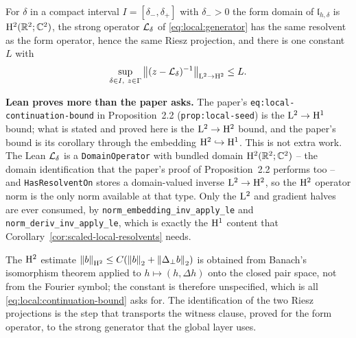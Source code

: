 \begin{lemma}
  \label{lem:local:h2-resolvent}
  \leanok
  For $\delta$ in a compact interval $I=[\delta_-,\delta_+]$ with $\delta_->0$ the form
  domain of $\mathfrak l_{h,\delta}$ is $\mathrm{H}^2(\mathbb{R}^2;\mathbb{C}^2)$, the strong operator
  $\mathcal{L}_\delta$ of \eqref{eq:local:generator} has the same resolvent as the form operator,
  hence the same Riesz projection, and there is one constant $L$ with
  \begin{equation}
    \sup_{\delta\in I,\ z\in\Gamma}
      \left\|(z-\mathcal{L}_\delta)^{-1}\right\|_{\mathrm{L}^2\to\mathrm{H}^2}\leq L .
    \label{eq:local:continuation-bound}
  \end{equation}
\end{lemma}

\textbf{Lean proves more than the paper asks.}  The paper's
\texttt{eq:local-continuation-bound} in Proposition~2.2 (\texttt{prop:local-seed}) is the
$\mathrm{L}^2\to\mathrm{H}^1$ bound; what is stated and proved here is the $\mathrm{L}^2\to\mathrm{H}^2$ bound, and the
paper's bound is its corollary through the embedding $\mathrm{H}^2\hookrightarrow\mathrm{H}^1$.  This is not extra work.  The Lean
$\mathcal{L}_\delta$ is a \texttt{DomainOperator} with bundled domain $\mathrm{H}^2(\mathbb{R}^2;\mathbb{C}^2)$ -- the
domain identification that the paper's proof of Proposition~2.2 performs too -- and
\texttt{HasResolventOn} stores a domain-valued inverse $\mathrm{L}^2\to\mathrm{H}^2$, so the $\mathrm{H}^2$
operator norm is the only norm available at that type.  Only the $\mathrm{L}^2$ and gradient halves
are ever consumed, by \texttt{norm\_embedding\_inv\_apply\_le} and
\texttt{norm\_deriv\_inv\_apply\_le}, which is exactly the $\mathrm{H}^1$ content that
Corollary~\ref{cor:scaled-local-resolvents} needs.

The $\mathrm{H}^2$ estimate $\left\|b\right\|_{\mathrm{H}^2}\leq C(\left\|b\right\|_2+\left\|\Delta_\perp b\right\|_2)$ is obtained
from Banach's isomorphism theorem applied to $h\mapsto(h,\Delta h)$ onto the closed pair
space, not from the Fourier symbol; the constant is therefore unspecified, which is all
\eqref{eq:local:continuation-bound} asks for.  The identification of the two Riesz
projections is the step that transports the witness clause, proved for the form operator,
to the strong generator that the global layer uses.

